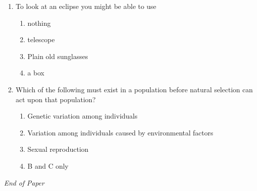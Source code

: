\documentclass[12pt]{article}
\begin{document}
\begin{enumerate}[label=\arabic*.]
\begin{enumerate}[label=(\alph*)]
    \item remain a mixture.
    \item remain a compound.
    \item become an element.
    \item become a compound.
\end{enumerate}
\item To look at an eclipse you might be able to use
\begin{enumerate}[label=(\alph*)]
    \item nothing
    \item telescope
    \item Plain old sunglasses
    \item a box
\end{enumerate}
\item Which of the following must exist in a population before natural selection can act upon that population?
\begin{enumerate}[label=(\alph*)]
    \item Genetic variation among individuals
    \item Variation among individuals caused by environmental factors
    \item Sexual reproduction
    \item B and C only
\end{enumerate}
\end{enumerate}

\vfill
\noindent\textit{End of Paper}
\end{document}
